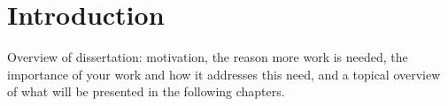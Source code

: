 \chapter{Introduction}\label{chap:intro}

Overview of dissertation: motivation, the reason more work is needed, the importance of your work and how it addresses this need, and a topical overview of what will be presented in the following chapters.

\endinput 